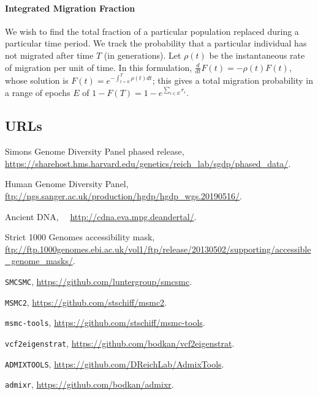 \documentclass{article}
\begin{document}
\paragraph{Integrated Migration Fraction}
We wish to find the total fraction of a particular population replaced during a particular time period. We track the probability that a particular individual has not migrated after time $T$ (in generations). Let $\rho(t)$ be the instantaneous rate of migration per unit of time. In this formulation, $\frac{d}{dt} F(t) = - \rho(t) F(t)$, whose solution is $F(t) = e^{- \int_{t=0}^T \rho(t) dt}$; this gives a total migration probability in a range of epochs $E$ of  $1-F(T) = 1 - e^{\sum_{i \in E} r_i}$. 

\subsection*{URLs}
{\small 
{Simons Genome Diversity Panel phased release}, \url{https://sharehost.hms.harvard.edu/genetics/reich_lab/sgdp/phased_data/}.

{Human Genome Diversity Panel}, \url{ftp://ngs.sanger.ac.uk/production/hgdp/hgdp_wgs.20190516/}.

{Ancient DNA},~~ \url{http://cdna.eva.mpg.deandertal/}.~~

{Strict 1000 Genomes accessibility mask}, \url{ftp://ftp.1000genomes.ebi.ac.uk/vol1/ftp/release/20130502/supporting/accessible_genome_masks/}.

{{\tt SMCSMC}}, \url{https://github.com/luntergroup/smcsmc}.

{{\tt MSMC2}}, \url{https://github.com/stschiff/msmc2}.

{{\tt msmc-tools}}, \url{https://github.com/stschiff/msmc-tools}.

{\tt vcf2eigenstrat}, \url{https://github.com/bodkan/vcf2eigenstrat}.

{\tt ADMIXTOOLS}, \url{https://github.com/DReichLab/AdmixTools}.

{\tt admixr}, \url{https://github.com/bodkan/admixr}.
}




\end{document}
